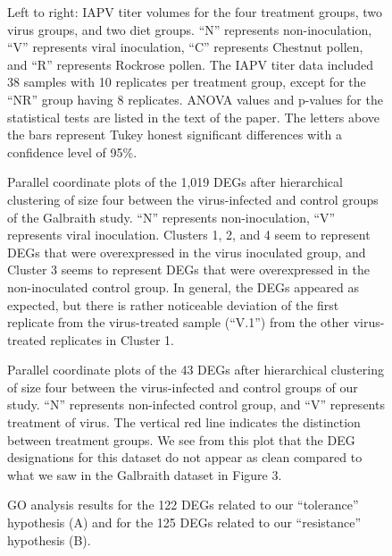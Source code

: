 \documentclass{bmcart}
\begin{document}
\begin{linenumbers}
\begin{backmatter}
\begin{figure}[h!]
\caption{
Left to right: IAPV titer volumes for the four treatment groups, two virus groups, and two diet groups. ``N'' represents non-inoculation, ``V'' represents viral inoculation, ``C'' represents Chestnut pollen, and ``R'' represents Rockrose pollen. The IAPV titer data included 38 samples with 10 replicates per treatment group, except for the ``NR'' group having 8 replicates. ANOVA values and p-values for the statistical tests are listed in the text of the paper. The letters above the bars represent Tukey honest significant differences with a confidence level of 95\%.}
\end{figure}

\begin{figure}[h!]
\caption{
Parallel coordinate plots of the 1,019 DEGs after hierarchical clustering of size four between the virus-infected and control groups of the Galbraith study. ``N'' represents non-inoculation, ``V'' represents viral inoculation. Clusters 1, 2, and 4 seem to represent DEGs that were overexpressed in the virus inoculated group, and Cluster 3 seems to represent DEGs that were overexpressed in the non-inoculated control group. In general, the DEGs appeared as expected, but there is rather noticeable deviation of the first replicate from the virus-treated sample (``V.1'') from the other virus-treated replicates in Cluster 1.}
\end{figure}

\begin{figure}[h!]
\caption{
Parallel coordinate plots of the 43 DEGs after hierarchical clustering of size four between the virus-infected and control groups of our study. ``N'' represents non-infected control group, and ``V'' represents treatment of virus. The vertical red line indicates the distinction between treatment groups. We see from this plot that the DEG designations for this dataset do not appear as clean compared to what we saw in the Galbraith dataset in Figure 3.}
\end{figure}

\begin{figure}[h!]
\caption{
GO analysis results for the 122 DEGs related to our ``tolerance'' hypothesis (A) and for the 125 DEGs related to our ``resistance'' hypothesis (B).}
\end{figure}


\end{backmatter}
\end{linenumbers}
\end{document}
